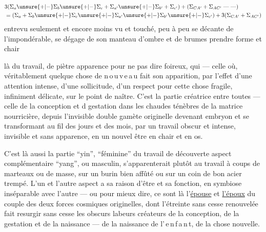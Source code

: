 \[
\begin{aligned}
&3(\Sigma_a\unsure{+|-}\Sigma_b\unsure{+|-}\Sigma_c+\Sigma_{a'}
 \unsure{+|-}\Sigma_{b'}+\Sigma_{c'})
 +(\Sigma_{CA'}+\Sigma_{AC'}\;\text{---}\;\text{---})\\
&=(\Sigma_a+\Sigma_b\unsure{+|-}\Sigma_c\unsure{+|-}\Sigma_{a'}
 \unsure{+|-}\Sigma_{b'}\unsure{+|-}\Sigma_{c'})+3(\Sigma_{CA'}+\Sigma_{AC'})
\end{aligned}
\]
entrevu seulement et encore moins vu et touché,  peu à peu se
décante de l'impondérable, se dégage de son manteau d'ombre et de brumes
 prendre forme et chair\inserted{\ldots}

là du travail,
de piètre apparence pour ne pas dire foireux, qui
--- celle où, véritablement quelque chose de n\,o\,u\,v\,e\,a\,u fait son apparition,
par l'effet d'une attention intense, d'une sollicitude, d'un respect pour cette chose fragile,
infiniment délicate, sur le point de naître. C'est la partie créatrice entre toutes ---
celle de la conception et d gestation
 dans les chaudes ténèbres de la matrice nourricière,
 depuis l'invisible double gamète 
originelle devenant embryon et se transformant au fil des jours et des mois,
par un travail obscur et intense, invisible et sans apparence, en un nouvel être en chair et en os.

C'est là aussi la partie ``yin'', ``féminine\deleted{\unsure{,}}'' du travail de découverte\deleted{---}
aspect complémentaire ``yang'', ou masculin,
s'apparenterait plutôt  au travail à coups de marteaux ou de masse,
sur un burin bien affûté ou sur un coin de bon acier trempé.
L'un et l'autre aspect a sa raison d'être et sa fonction, en symbiose inséparable
avec l'autre --- ou pour mieux dire, ce sont là l'\uline{épouse} et \uline{l'époux}
du couple des deux forces cosmiques originelles, dont l'étreinte
sans cesse renouvelée fait resurgir sans cesse les obscurs labeurs créateurs de la conception,
de la gestation et de la naissance --- de la naissance de l'\,e\,n\,f\,a\,n\,t, de la chose nouvelle.

